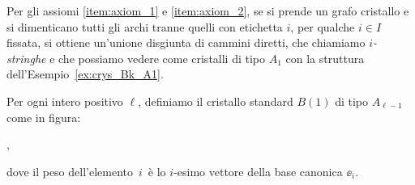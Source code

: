 \begin{remark}
    \label{rmk:crys_unione_istringhe}
    Per gli assiomi \ref{item:axiom_1} e \ref{item:axiom_2},
    se si prende un grafo cristallo e si dimenticano
    tutti gli archi tranne quelli con etichetta $i$, per qualche $i \in I$ fissata,
    si ottiene un'unione disgiunta di cammini diretti, che chiamiamo \emph{$i$-stringhe}
    e che possiamo vedere come 
    cristalli di tipo $A_1$ con la struttura dell'Esempio~\ref{ex:crys_Bk_A1}.
\end{remark}

\begin{example}
    Per ogni intero positivo $\ell$, definiamo il cristallo standard $B(1)$ di tipo $A_{\ell-1}$
    come in figura:
    \begin{center}
        ,
    \end{center}
    dove il peso dell'elemento 
    $\boxed{\,i\,}$
    \`e lo $i$-esimo vettore della base canonica $\ee_i$.

\end{example}

